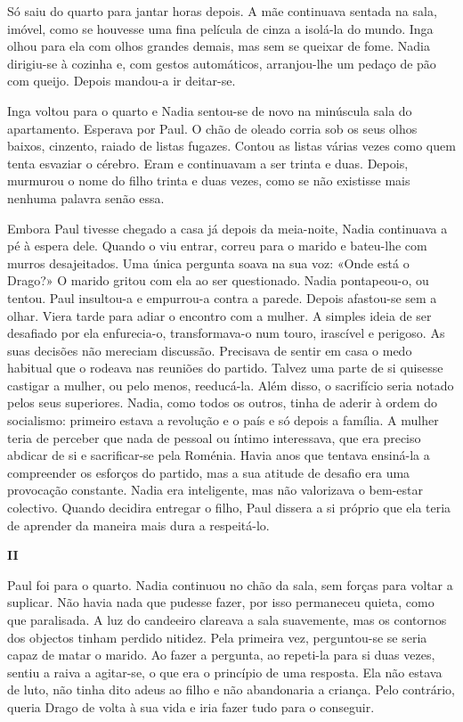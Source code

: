 Só saiu do quarto para jantar horas depois. A mãe continuava sentada
na sala, imóvel, como se houvesse uma fina película de cinza a isolá-la
do mundo. Inga olhou para ela com olhos grandes demais, mas sem se
queixar de fome. Nadia dirigiu-se à cozinha e, com gestos automáticos,
arranjou-lhe um pedaço de pão com queijo. Depois mandou-a ir deitar-se.

Inga voltou para o quarto e Nadia sentou-se de novo na minúscula sala do
apartamento. Esperava por Paul. O chão de oleado corria sob os seus
olhos baixos, cinzento, raiado de listas fugazes. Contou as listas
várias vezes como quem tenta esvaziar o cérebro. Eram e continuavam a
ser trinta e duas. Depois, murmurou o nome do filho trinta e duas vezes,
como se não existisse mais nenhuma palavra senão essa.

Embora Paul tivesse chegado a casa já depois da meia-noite, Nadia continuava a pé à espera dele. Quando o viu entrar, correu
para o marido e bateu-lhe com murros desajeitados. Uma única pergunta
soava na sua voz: «Onde está o Drago?» O marido gritou com ela ao ser
questionado. Nadia pontapeou-o, ou tentou. Paul insultou-a e
empurrou-a contra a parede. Depois afastou-se sem a olhar. Viera tarde
para adiar o encontro com a mulher. A simples ideia de ser desafiado por
ela enfurecia-o, transformava-o num touro, irascível e perigoso. As suas
decisões não mereciam discussão. Precisava de sentir em
casa o medo habitual que o rodeava nas reuniões do partido. Talvez uma
parte de si quisesse castigar a mulher, ou pelo menos, reeducá-la. Além
disso, o sacrifício seria notado pelos seus superiores. Nadia, como
todos os outros, tinha de aderir à ordem do socialismo: primeiro estava
a revolução e o país e só depois a família. A mulher teria de perceber
que nada de pessoal ou íntimo interessava, que era preciso abdicar de
si e sacrificar-se pela Roménia. Havia anos que tentava ensiná-la a
compreender os esforços do partido, mas a sua atitude de desafio era uma
provocação constante. Nadia era inteligente, mas não valorizava o
bem-estar colectivo. Quando decidira entregar o filho, Paul dissera a
si próprio que ela teria de aprender da maneira mais dura a
respeitá-lo.


\pagebreak
\vspace*{1.8cm}
\noindent{}\textbf{II}

\bigskip


Paul foi para o quarto. Nadia continuou no chão da sala, sem forças para
voltar a suplicar. Não havia nada que pudesse fazer, por isso permaneceu
quieta, como que paralisada. A luz do candeeiro clareava a sala
suavemente, mas os contornos dos objectos tinham perdido nitidez. Pela
primeira vez, perguntou-se se seria capaz de matar o marido. Ao fazer a
pergunta, ao repeti-la para si duas vezes, sentiu a raiva a agitar-se, o
que era o princípio de uma resposta. Ela não estava de luto, não tinha
dito adeus ao filho e não abandonaria a criança. Pelo contrário, queria
Drago de volta à sua vida e iria fazer tudo para o conseguir.

